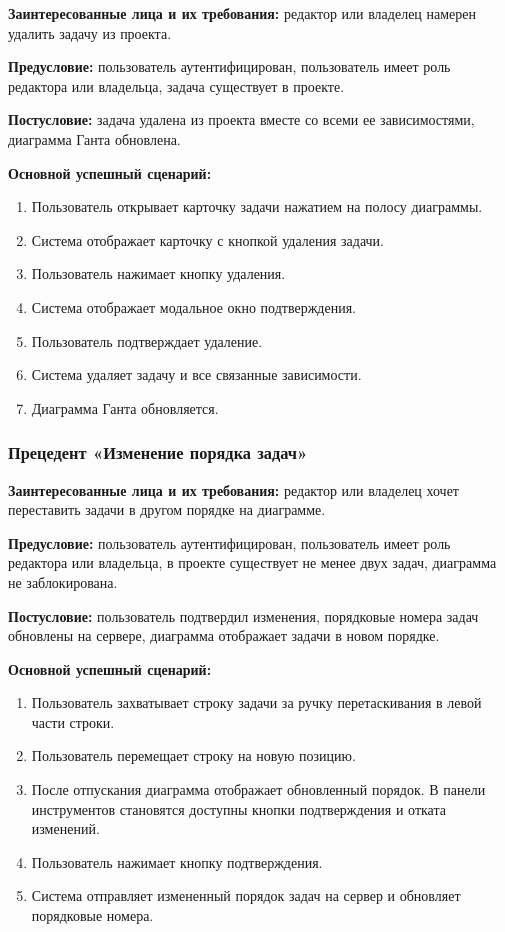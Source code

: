 \textbf{Заинтересованные лица и их требования:} редактор или владелец намерен удалить задачу из проекта.

\textbf{Предусловие:} пользователь аутентифицирован, пользователь имеет роль редактора или владельца, задача существует в проекте.

\textbf{Постусловие:} задача удалена из проекта вместе со всеми ее зависимостями, диаграмма Ганта обновлена.

\textbf{Основной успешный сценарий:}
\begin{enumerate}
    \item Пользователь открывает карточку задачи нажатием на полосу диаграммы.
    \item Система отображает карточку с кнопкой удаления задачи.
    \item Пользователь нажимает кнопку удаления.
    \item Система отображает модальное окно подтверждения.
    \item Пользователь подтверждает удаление.
    \item Система удаляет задачу и все связанные зависимости.
    \item Диаграмма Ганта обновляется.
\end{enumerate}

\subsubsection{Прецедент «Изменение порядка задач»}

\textbf{Заинтересованные лица и их требования:} редактор или владелец хочет переставить задачи в другом порядке на диаграмме.

\textbf{Предусловие:} пользователь аутентифицирован, пользователь имеет роль редактора или владельца, в проекте существует не менее двух задач, диаграмма не заблокирована.

\textbf{Постусловие:} пользователь подтвердил изменения, порядковые номера задач обновлены на сервере, диаграмма отображает задачи в новом порядке.

\textbf{Основной успешный сценарий:}
\begin{enumerate}
    \item Пользователь захватывает строку задачи за ручку перетаскивания в левой части строки.
    \item Пользователь перемещает строку на новую позицию.
    \item После отпускания диаграмма отображает обновленный порядок. В панели инструментов становятся доступны кнопки подтверждения и отката изменений.
    \item Пользователь нажимает кнопку подтверждения.
    \item Система отправляет измененный порядок задач на сервер и обновляет порядковые номера.
\end{enumerate}

